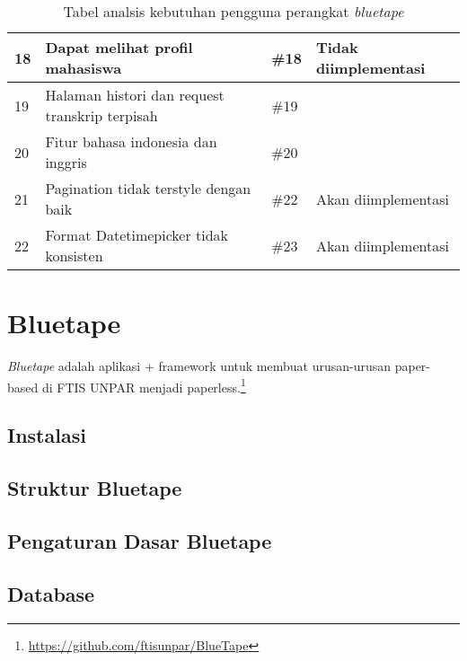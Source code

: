 \begin{table}[H]
{\begin{tabular}{|l|l|l|l|}
	18 & Dapat melihat profil mahasiswa & \#18 & Tidak diimplementasi\\ \hline
	19 & Halaman histori dan request transkrip terpisah & \#19 & \\ \hline
	20 & Fitur bahasa indonesia dan inggris & \#20 & \\ \hline
	21 & Pagination tidak terstyle dengan baik & \#22 & Akan diimplementasi\\ \hline
	22 & Format Datetimepicker tidak konsisten &\#23 & Akan diimplementasi\\ \hline
	
	
	\end{tabular}}
	\caption{Tabel analsis kebutuhan pengguna perangkat \textit{bluetape}}
\end{table}


\section{Bluetape}

\textit{Bluetape} adalah aplikasi + framework untuk membuat urusan-urusan paper-based di FTIS UNPAR menjadi paperless.\footnote{\url{https://github.com/ftisunpar/BlueTape}}

\subsection{Instalasi}

\subsection{Struktur Bluetape}

\subsection{Pengaturan Dasar Bluetape}

\subsection{Database}